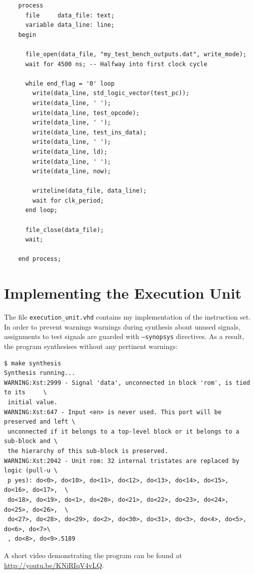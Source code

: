 \documentclass[12pt,a4paper]{article}
\begin{document}
\newpage
\begin{verbatim}
    process
      file     data_file: text;
      variable data_line: line;
    begin

      file_open(data_file, "my_test_bench_outputs.dat", write_mode);
      wait for 4500 ns; -- Halfway into first clock cycle

      while end_flag = '0' loop
        write(data_line, std_logic_vector(test_pc));
        write(data_line, ' ');
        write(data_line, test_opcode);
        write(data_line, ' ');
        write(data_line, test_ins_data);
        write(data_line, ' ');
        write(data_line, ld);
        write(data_line, ' ');
        write(data_line, now);

        writeline(data_file, data_line);
        wait for clk_period;
      end loop;

      file_close(data_file);
      wait;

    end process;
\end{verbatim}

\section{Implementing the Execution Unit}

The file \texttt{execution\_unit.vhd} contains my implementation of
the instruction set. In order to prevent warnings warnings during
synthesis about unused signals, assignments to test signals are
guarded with \texttt{--synopsys} directives. As a result, the program synthesises
without any pertinent warnings:

\begin{verbatim}
$ make synthesis
Synthesis running...
WARNING:Xst:2999 - Signal 'data', unconnected in block 'rom', is tied to its     \
 initial value.
WARNING:Xst:647 - Input <en> is never used. This port will be preserved and left \
 unconnected if it belongs to a top-level block or it belongs to a sub-block and \
 the hierarchy of this sub-block is preserved.
WARNING:Xst:2042 - Unit rom: 32 internal tristates are replaced by logic (pull-u \
 p yes): do<0>, do<10>, do<11>, do<12>, do<13>, do<14>, do<15>, do<16>, do<17>,  \
 do<18>, do<19>, do<1>, do<20>, do<21>, do<22>, do<23>, do<24>, do<25>, do<26>,  \
 do<27>, do<28>, do<29>, do<2>, do<30>, do<31>, do<3>, do<4>, do<5>, do<6>, do<7>\
 , do<8>, do<9>.5189
\end{verbatim}

A short video demonstrating the program can be found at
\url{http://youtu.be/KNiRIqV4vLQ}.
\end{document}
